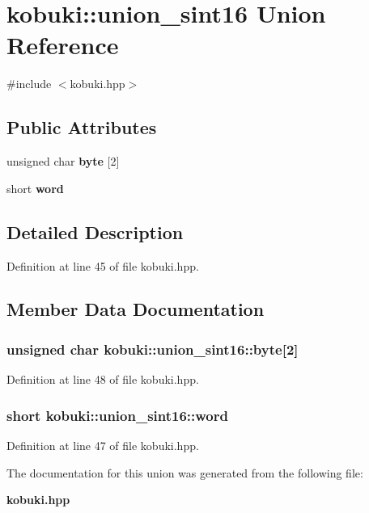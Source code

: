 \section{kobuki\-:\-:union\-\_\-sint16 \-Union \-Reference}
\label{unionkobuki_1_1union__sint16}


{\ttfamily \#include $<$kobuki.\-hpp$>$}

\subsection*{\-Public \-Attributes}
\begin{DoxyCompactItemize}
\item 
unsigned char {\bf byte} [2]
\item 
short {\bf word}
\end{DoxyCompactItemize}


\subsection{\-Detailed \-Description}


\-Definition at line 45 of file kobuki.\-hpp.



\subsection{\-Member \-Data \-Documentation}
\subsubsection[{byte}]{\setlength{\rightskip}{0pt plus 5cm}unsigned char {\bf kobuki\-::union\-\_\-sint16\-::byte}[2]}\label{unionkobuki_1_1union__sint16_a4a741b269df98ac2cb4d90e67c1048a6}


\-Definition at line 48 of file kobuki.\-hpp.

\subsubsection[{word}]{\setlength{\rightskip}{0pt plus 5cm}short {\bf kobuki\-::union\-\_\-sint16\-::word}}\label{unionkobuki_1_1union__sint16_aa13ccf773b329c89ee27ee71e9517b7e}


\-Definition at line 47 of file kobuki.\-hpp.



\-The documentation for this union was generated from the following file\-:\begin{DoxyCompactItemize}
\item 
{\bf kobuki.\-hpp}\end{DoxyCompactItemize}
